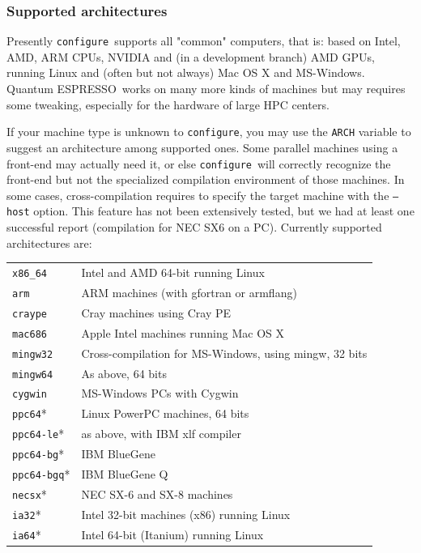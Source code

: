 \documentclass[12pt,a4paper]{article}
\def\qe{{\sc Quantum ESPRESSO}}
\def\configure{\texttt{configure}}
\begin{document}
\subsubsection{Supported architectures}
Presently \configure\ supports all "common" computers, that is: based on 
Intel, AMD, ARM CPUs, NVIDIA and (in a development branch) AMD GPUs,
running Linux and (often but not always) Mac OS X and MS-Windows.
\qe\ works on many more kinds of machines but may requires some tweaking, 
especially for the hardware of large HPC centers.

If your machine type is unknown to \configure, you may use the
\texttt{ARCH}
variable to suggest an architecture among supported ones. Some 
parallel machines using a front-end may actually
need it, or else \configure\ will correctly recognize the front-end
but not the specialized compilation environment of those machines.
In some cases, cross-compilation requires to specify the target machine
with the \texttt{--host} option. This feature has not been extensively
tested, but we had at least one successful report (compilation
for NEC SX6 on a PC). Currently supported architectures are:

\begin{tabular}{ll}
\texttt{x86\_64}   & Intel and AMD 64-bit running Linux\\
\texttt{arm}       & ARM machines (with gfortran or armflang)\\
\texttt{craype}    & Cray machines using Cray PE\\
\texttt{mac686}    & Apple Intel machines running Mac OS X\\
\texttt{mingw32}   & Cross-compilation for MS-Windows, using mingw, 32 bits\\
\texttt{mingw64}   & As above, 64 bits\\
\texttt{cygwin}    & MS-Windows PCs with Cygwin\\
\texttt{ppc64}*    & Linux PowerPC machines, 64 bits\\
\texttt{ppc64-le}* & as above, with IBM xlf compiler\\
\texttt{ppc64-bg}* & IBM BlueGene\\
\texttt{ppc64-bgq}*& IBM BlueGene Q\\
\texttt{necsx}*    & NEC SX-6 and SX-8 machines\\
\texttt{ia32}*     & Intel 32-bit machines (x86) running Linux\\
\texttt{ia64}*     & Intel 64-bit (Itanium) running Linux
\end{tabular}\\
\end{document}
